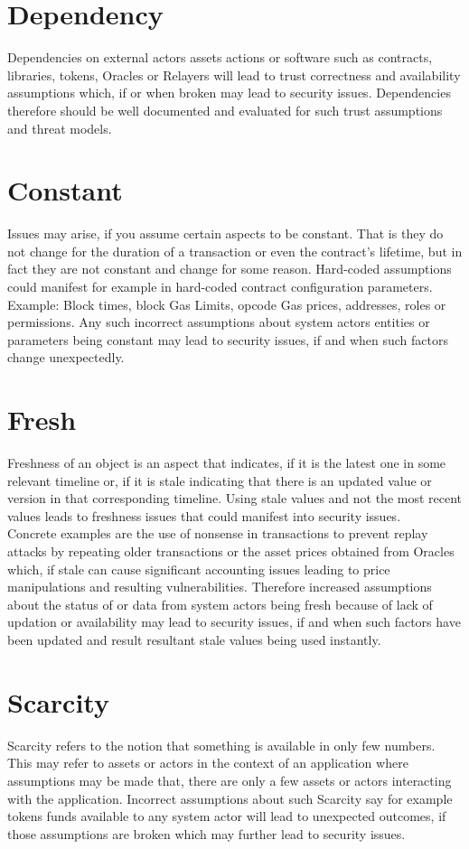 \section{Dependency}
Dependencies on external actors assets actions or software such as contracts, libraries, tokens, Oracles or Relayers will lead to trust correctness and availability assumptions which, if or when broken may lead to security issues. Dependencies therefore should be well documented and evaluated for such trust assumptions and threat models.

\section{Constant}
Issues may arise, if you assume certain aspects to be constant. That is they do not change for the duration of a transaction or even the contract's lifetime, but in fact they are not constant and change for some reason. Hard-coded assumptions could manifest for example in hard-coded contract configuration parameters. Example: Block times, block Gas Limits, opcode Gas prices, addresses, roles or permissions. Any such incorrect assumptions about system actors entities or parameters being constant may lead to security issues, if and when such factors change unexpectedly.

\section{Fresh}
Freshness of an object is an aspect that indicates, if it is the latest one in some relevant timeline or, if it is stale indicating that there is an updated value or version in that corresponding timeline. Using stale values and not the most recent values leads to freshness issues that could manifest into security issues.\\

Concrete examples are the use of nonsense in transactions to prevent replay attacks by repeating older transactions or the asset prices obtained from Oracles which, if stale can cause significant accounting issues leading to price manipulations and resulting vulnerabilities. Therefore increased assumptions about the status of or data from system actors being fresh because of lack of updation or availability may lead to security issues, if and when such factors have been updated and result resultant stale values being used instantly.

\section{Scarcity}
Scarcity refers to the notion that something is available in only few numbers. This may refer to assets or actors in the context of an application where assumptions may be made that, there are only a few assets or actors interacting with the application. Incorrect assumptions about such Scarcity say for example tokens funds available to any system actor will lead to unexpected outcomes, if those assumptions are broken which may further lead to security issues.\\

